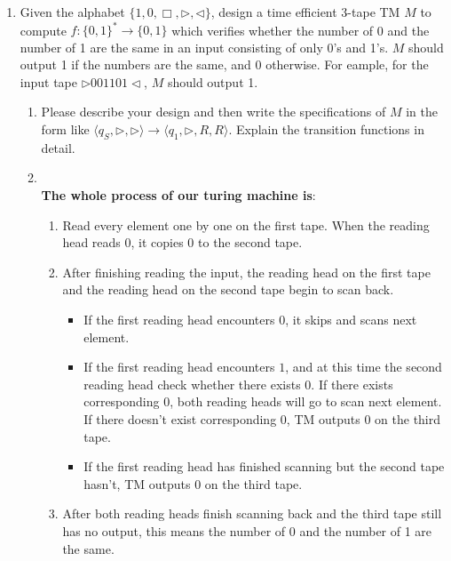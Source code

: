 \documentclass[12pt,a4paper]{article}
\makeatletter
\newtheorem*{solution}{Solution}
\theoremstyle{definition}
\renewenvironment{solution}[1][Solution] {\par\pushQED{\qed}\normalfont\topsep6\p@\@plus6\p@\relax\trivlist\item[\hskip\labelsep\bfseries#1\@addpunct{.}]\ignorespaces}{\popQED\endtrivlist\@endpefalse} \makeatother
\makeatother
\begin{document}
\begin{enumerate}
\begin{enumerate}
\end{enumerate}

    \item 
    Given the alphabet $\{1, 0, \Box, \triangleright, \triangleleft\}$, design a time efficient 3-tape TM $M$ to compute $f:\{0,1\}^*\rightarrow\{0,1\}$ which verifies whether the number of 0 and the number of 1 are the same in an input consisting of only 0's and 1's. $M$ should output 1 if the numbers are the same, and 0 otherwise. For eample, for the input tape $\triangleright 001101\triangleleft$, $M$ should output 1.
    
    \begin{enumerate}
	    \item
	    Please describe your design and then write the specifications of $M$ in the form like $\langle q_S, \triangleright, \triangleright \rangle \rightarrow \langle q_1, \triangleright,  R, R \rangle$. Explain the transition functions in detail.
	    \begin{solution}
	    ~\\
	   \textbf{ The whole process of our turing machine is}:
	    \begin{enumerate}
	        \item Read every element one by one on the first tape. When the reading head reads $0$, it copies $0$ to the second tape.
	        \item After finishing reading the input, the reading head on the first tape and the reading head on the second tape begin to scan back.
	        \begin{itemize}
	            \item If the first reading head encounters $0$, it skips and scans next element. 
	            \item If the first reading head encounters $1$, and at this time the second reading head check whether there exists $0$. If there exists corresponding $0$, both reading heads will go to scan next element. If there doesn't exist corresponding $0$, TM outputs $0$ on the third tape.
	            \item If the first reading head has finished scanning but the second tape hasn't, TM outputs $0$ on the third tape.
	        \end{itemize}
	        \item After both reading heads finish scanning back and the third tape still has no output, this means the number of 0 and the number of 1 are the same.
	    \end{enumerate}
	    

\end{solution}
\end{enumerate}
\end{enumerate}
\end{document}
